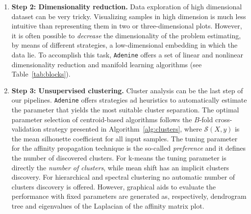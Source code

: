 \documentclass[twoside,11pt]{article}
\makeatletter
\newcommand{\ade}{\texttt{Adenine}\@\xspace}
\makeatother
\begin{document}
\begin{enumerate}
  \item[]{\bf Step 2: Dimensionality reduction.}
  Data exploration of high dimensional dataset can be very tricky. Visualizing samples in high dimension is much less intuitive than representing them in two or three-dimensional plots. However, it is often possible to \emph{decrease} the dimensionality of the problem estimating, by means of different strategies, a low-dimensional embedding in which the data lie. To accomplish this task, \ade offers a set of linear and nonlinear dimensionality reduction and manifold learning algorithms (see Table~\ref{tab:blocks}).

  \item[]{\bf Step 3: Unsupervised clustering.}
  Cluster analysis can be the last step of our pipelines. 
  \ade offers strategies ad heuristics to automatically estimate the parameter that yields the most suitable cluster separation. The optimal parameter selection of centroid-based algorithms follows the $B$-fold cross-validation strategy presented in Algorithm~\ref{alg:clusters}, where $\mathcal{S}(X,y)$ is the mean silhouette coefficient \citep{rousseeuw1987silhouettes} for all input samples.
  The tuning parameter for the affinity propagation technique \citep{frey2007clustering} is the so-called \emph{preference} and it defines the number of discovered clusters. For k-means \citep{bishop2006pattern} the tuning parameter is directly the \emph{number of clusters}, while mean shift \citep{comaniciu2002mean} has an implicit clusters discovery. For hierarchical \citep{friedman2001elements} and spectral clustering \citep{shi2000normalized} no automatic number of clusters discovery is offered. However, graphical aids to evaluate the performance with fixed parameters are generated as, respectively, dendrogram tree and eigenvalues of the Laplacian of the affinity matrix plot.
 

\end{enumerate}
\end{document}
